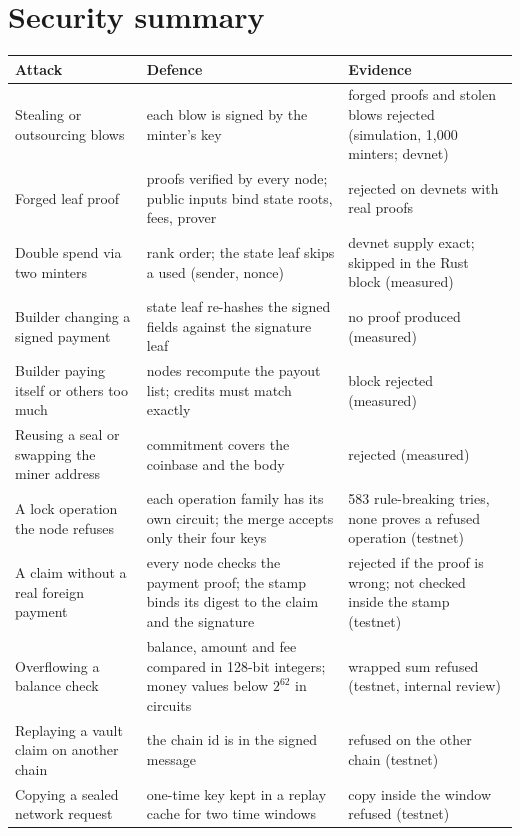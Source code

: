 \section{Security summary}\label{sec:security}

\begin{center}\begin{minipage}{\textwidth}\centering
\centering\small
\begin{tabularx}{\textwidth}{l Y Y}
\toprule
\textbf{Attack} & \textbf{Defence} & \textbf{Evidence}\\
\midrule
Stealing or outsourcing blows & each blow is signed by the minter's key & forged proofs and stolen blows rejected (simulation, 1,000 minters; devnet)\\
Forged leaf proof & proofs verified by every node; public inputs bind state roots, fees, prover & rejected on devnets with real proofs\\
Double spend via two minters & rank order; the state leaf skips a used (sender, nonce) & devnet supply exact; skipped in the Rust block (measured)\\
Builder changing a signed payment & state leaf re-hashes the signed fields against the signature leaf & no proof produced (measured)\\
Builder paying itself or others too much & nodes recompute the payout list; credits must match exactly & block rejected (measured)\\
Reusing a seal or swapping the miner address & commitment covers the coinbase and the body & rejected (measured)\\
A lock operation the node refuses & each operation family has its own circuit; the merge accepts only their four keys & 583 rule-breaking tries, none proves a refused operation (testnet)\\
A claim without a real foreign payment & every node checks the payment proof; the stamp binds its digest to the claim and the signature & rejected if the proof is wrong; not checked inside the stamp (testnet)\\
Overflowing a balance check & balance, amount and fee compared in 128-bit integers; money values below $2^{62}$ in circuits & wrapped sum refused (testnet, internal review)\\
Replaying a vault claim on another chain & the chain id is in the signed message & refused on the other chain (testnet)\\
Copying a sealed network request & one-time key kept in a replay cache for two time windows & copy inside the window refused (testnet)\\

\end{tabularx}
\end{minipage}
\end{center}
